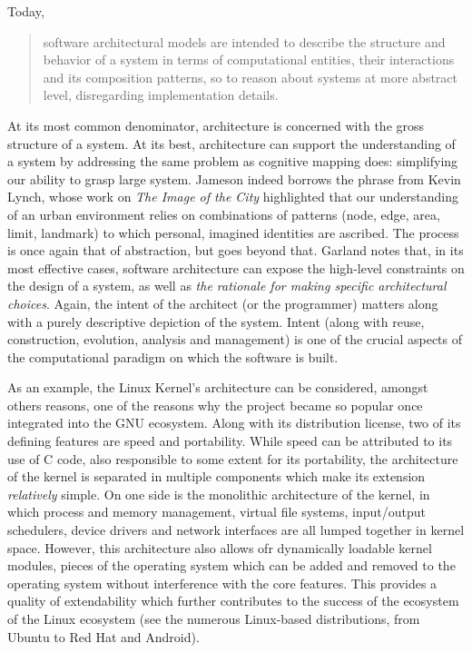 \documentclass{article}
\begin{document}
Today, 
\begin{quote}
  software architectural models are intended to describe the structure and behavior of a system in terms of computational entities, their interactions and its composition patterns, so to reason about systems at more abstract  level, disregarding implementation details.\cite{garland_software_2000}
\end{quote}

At its most common denominator, architecture is concerned with the gross structure of a system. At its best, architecture can support the understanding of a system by addressing the same problem as cognitive mapping does: simplifying our ability to grasp large system. Jameson indeed borrows the phrase from Kevin Lynch, whose work on \emph{The Image of the City} highlighted that our understanding of an urban environment relies on combinations of patterns (node, edge, area, limit, landmark) to which personal, imagined identities are ascribed. The process is once again that of abstraction, but goes beyond that. Garland notes that, in its most effective cases, software architecture can expose the high-level constraints on the design of a system, as well as \emph{the rationale for making specific architectural choices}. Again, the intent of the architect (or the programmer) matters along with a purely descriptive depiction of the system. Intent (along with reuse, construction, evolution, analysis and management) is one of the crucial aspects of the computational paradigm on which the software is built.

As an example, the Linux Kernel's architecture can be considered, amongst others reasons, one of the reasons why the project became so popular once integrated into the GNU ecosystem. Along with its distribution license, two of its defining features are speed and portability. While speed can be attributed to its use of C code, also responsible to some extent for its portability, the architecture of the kernel is separated in multiple components which make its extension \emph{relatively} simple. On one side is the monolithic architecture of the kernel, in which process and memory management, virtual file systems, input/output schedulers, device drivers and network interfaces are all lumped together in kernel space. However, this architecture also allows ofr dynamically loadable kernel modules, pieces of the operating system which can be added and removed to the operating system without interference with the core features. This provides a quality of extendability which further contributes to the success of the ecosystem of the Linux ecosystem (see the numerous Linux-based distributions, from Ubuntu to Red Hat and Android).
\end{document}
